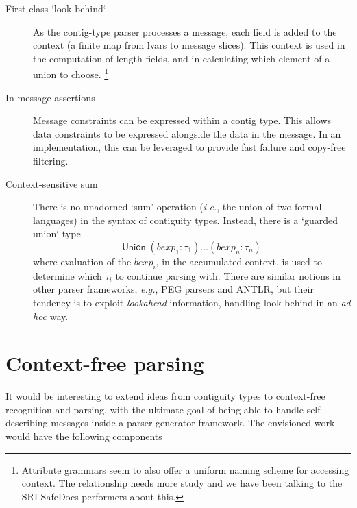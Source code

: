 \documentclass{article}
\newcommand{\ie}{\textit{i.e.}}
\newcommand{\eg}{\textit{e.g.}}
\newcommand{\adhoc}{\textit{ad hoc}}
\newcommand{\konst}[1]{\ensuremath{\mathsf{#1}}}
\begin{document}
\begin{description}

\item [First class `look-behind`] As the contig-type parser processes
  a message, each field is added to the context (a finite map from
  lvars to message slices). This context is used in the computation of
  length fields, and in calculating which element of a union to
  choose. \footnote{Attribute grammars seem to also offer a uniform
    naming scheme for accessing context. The relationship needs more
    study and we have been talking to the SRI SafeDocs performers
    about this.}

\item [In-message assertions] Message constraints can be expressed
  within a contig type. This allows data constraints to be expressed
  alongside the data in the message. In an implementation, this can be
  leveraged to provide fast failure and copy-free filtering.

\item [Context-sensitive sum] There is no unadorned `sum' operation
  (\ie, the union of two formal languages) in the syntax of contiguity
  types. Instead, there is a `guarded union` type
  \[
    \konst{Union}\; (\mathit{bexp}_1 : \tau_1) \ldots (\mathit{bexp}_n : \tau_n)
  \]
  where evaluation of the $\mathit{bexp}_i$, in the accumulated
  context, is used to determine which $\tau_i$ to continue parsing
  with. There are similar notions in other parser frameworks, \eg, PEG
  parsers and ANTLR, but their tendency is to exploit \emph{lookahead}
  information, handling look-behind in an \adhoc{} way.


\end{description}

\section{Context-free parsing}

 It would be interesting to extend ideas from contiguity types to
context-free recognition and parsing, with the ultimate goal of being
able to handle self-describing messages inside a parser generator
framework. The envisioned work would have the following components
\end{document}
